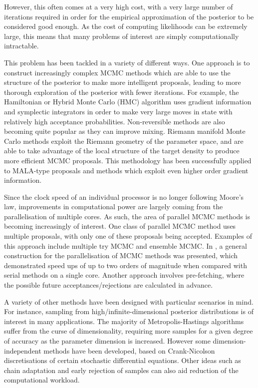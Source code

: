 \documentclass[final]{siamltex}
\begin{document}
However, this often comes at a very high cost, with a very large
number of iterations required in order for the empirical approximation
of the posterior to be considered good enough. As the cost of
computing likelihoods can be extremely large, this means that many
problems of interest are simply computationally intractable.

This problem has been tackled in a variety of different ways. One
approach is to construct increasingly complex MCMC methods which are
able to use the structure of the posterior to make more intelligent
proposals, leading to more thorough exploration of the posterior with
fewer iterations. For example, the Hamiltonian or Hybrid Monte Carlo
(HMC) algorithm uses gradient information and symplectic integrators
in order to make very large moves in state with relatively high
acceptance probabilities\cite{sexton1992hamiltonian}. Non-reversible
methods are also becoming quite popular as they can improve
mixing\cite{bierkens2015non}. Riemann
manifold Monte Carlo methods exploit the Riemann geometry of the
parameter space, and are able to take advantage of the local structure
of the target density to produce more efficient MCMC
proposals\cite{girolami2011riemann}. This methodology has been
successfully applied to MALA-type proposals and methods which exploit
even higher order gradient information\cite{bui2014solving}.

Since the clock speed of an individual processor is no longer
following Moore's law\cite{moore1998cramming}, improvements in
computational power are largely coming from the parallelisation of
multiple cores. As such, the area of parallel MCMC methods is becoming
increasingly of interest. One class of parallel MCMC method uses
multiple proposals, with only one of these proposals being
accepted. Examples of this approach include multiple try
MCMC\cite{liu2000multiple} and ensemble MCMC\cite{neal2011mcmc}. In
\cite{calderhead2014general}, a general construction for the
parallelisation of MCMC methods was presented, which demonstrated
speed ups of up to two orders of magnitude when compared with serial
methods on a single core. Another approach involves pre-fetching, where the possible future acceptances/rejections are calculated in advance\cite{angelino2014accelerating}.

A variety of other methods have been designed with particular scenarios in mind. For
instance, sampling from high/infinite-dimensional
posterior distributions is of interest in many applications. The majority of
Metropolis-Hastings algorithms suffer from the curse of
dimensionality, requiring more samples for a given degree of accuracy
as the parameter dimension is increased. However some
dimension-independent methods have been developed, based on
Crank-Nicolson discretisations of certain stochastic differential
equations\cite{cotter2013mcmc}. Other ideas such as chain
adaptation\cite{haario2005componentwise} and early rejection of
samples can also aid reduction of the computational
workload\cite{solonen2012efficient}.
\end{document}
